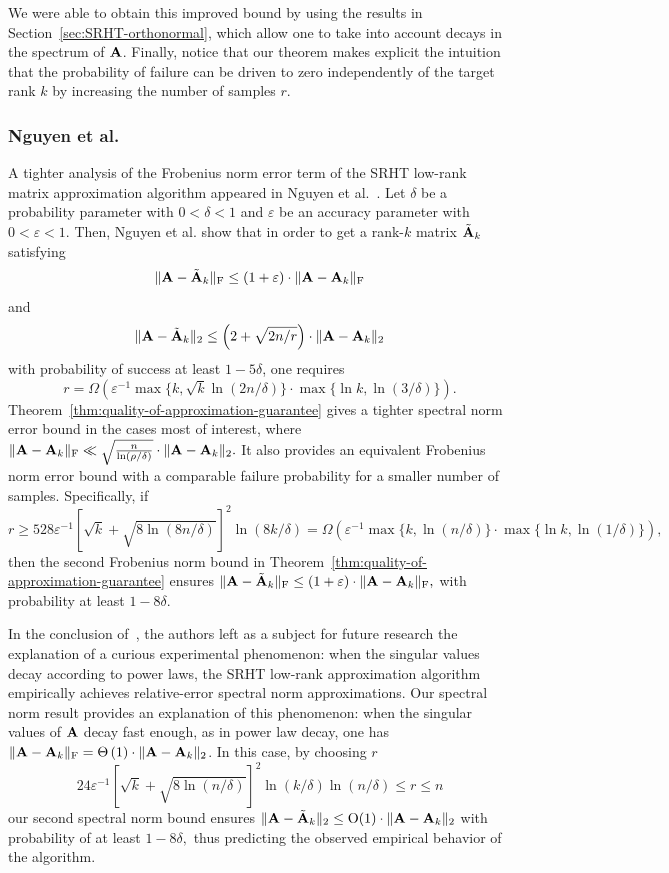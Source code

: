 We were able to obtain this improved bound
by using the results in Section~\ref{sec:SRHT-orthonormal}, which allow one to take into account decays in the spectrum of ${\bm{\mathrm{A}}}$.
Finally, notice that our theorem makes explicit the intuition that the probability of failure can be driven to zero independently of the target rank $k$ by increasing the number of samples $r.$

\subsubsection{Nguyen et al.~\cite{NDT09}}
A tighter analysis of the Frobenius norm error term of the SRHT low-rank matrix approximation algorithm appeared in Nguyen et al.~\cite{NDT09}.
Let $\delta$ be a probability parameter with $0 < \delta < 1$ and $\varepsilon$ be an accuracy parameter with $0 < \varepsilon <1 $.
Then, Nguyen et al. show that in order to
get a rank-$k$ matrix $\tilde{{\bm{\mathrm{A}}}}_k$ satisfying
$$ \mbox{}\| {\bm{\mathrm{A}}} - \tilde{{\bm{\mathrm{A}}}}_k\|_\mathrm{F} \le \left(1 + \varepsilon \right)  \cdot \mbox{}\|{\bm{\mathrm{A}}}-{\bm{\mathrm{A}}}_k\|_\mathrm{F}$$
and
\[
 \mbox{}\|{\bm{\mathrm{A}}} -\tilde{{\bm{\mathrm{A}}}}_k\|_2 \leq
 \left( 2 + \sqrt{2 n / r} \right) \cdot \mbox{}\|{\bm{\mathrm{A}}}-{\bm{\mathrm{A}}}_k\|_2
\]
with probability of success at least $1 - 5 \delta$, one requires
\[
r = \Omega\left( \varepsilon^{-1} \max\{  k, \sqrt{k} \ln(2n/\delta) \}  \cdot \max\{ \ln k, \ln(3/\delta) \}  \right).
\]
Theorem~\ref{thm:quality-of-approximation-guarantee} gives a tighter spectral norm error bound in the cases most of interest, where $\mbox{}\|{\bm{\mathrm{A}}} - {\bm{\mathrm{A}}}_k\|_\mathrm{F} \ll \sqrt{ {n\over  \ln(\rho/\delta) } } \cdot \mbox{}\|{\bm{\mathrm{A}}} - {\bm{\mathrm{A}}}_k\|_2.$ It also provides an equivalent Frobenius norm error bound with a comparable failure probability for a smaller number of samples. Specifically, if
\[
 r \geq 528 \varepsilon^{-1}[\sqrt{k} + \sqrt{8 \ln(8 n/\delta)}]^2 \ln(8k/\delta) = \Omega\left( \varepsilon^{-1} \max\{k, \ln(n/\delta)\} \cdot \max\{\ln k, \ln(1/\delta)\} \right),
\]
then the second Frobenius norm bound in Theorem~\ref{thm:quality-of-approximation-guarantee} ensures $\mbox{}\| {\bm{\mathrm{A}}} - \tilde{{\bm{\mathrm{A}}}}_k\|_\mathrm{F} \le \left(1 + \varepsilon \right)  \cdot \mbox{}\|{\bm{\mathrm{A}}}-{\bm{\mathrm{A}}}_k\|_\mathrm{F},$
with probability at least $1 - 8\delta.$

In the conclusion of~\cite{NDT09}, the authors left as a subject for future research the explanation of a curious experimental phenomenon: when the singular values decay according to power laws, the SRHT low-rank approximation algorithm empirically achieves relative-error spectral norm approximations. Our spectral norm result provides an explanation of this phenomenon: when the singular values of ${\bm{\mathrm{A}}}$ decay fast enough, as in power law decay, one has $ \mbox{}\|{\bm{\mathrm{A}}}-{\bm{\mathrm{A}}}_k\|_\mathrm{F} = \Theta\left( 1 \right) \cdot \mbox{}\|{\bm{\mathrm{A}}}-{\bm{\mathrm{A}}}_k\|_2 $. In this case, by choosing  $r$
$$ 24 \varepsilon^{-1} \left[\sqrt{k} + \sqrt{8\ln(n/\delta)} \right]^2 \ln(k/\delta) \ln(n/\delta) \leq r \leq n$$
our second spectral norm bound ensures
$
 \mbox{}\|{\bm{\mathrm{A}}} - \tilde{{\bm{\mathrm{A}}}}_k\|_2 \leq \mathrm{O}( 1 ) \cdot \mbox{}\|{\bm{\mathrm{A}}}-{\bm{\mathrm{A}}}_k\|_2
$
with probability of at least $1 - 8\delta,$ thus predicting the observed empirical behavior of the algorithm.

